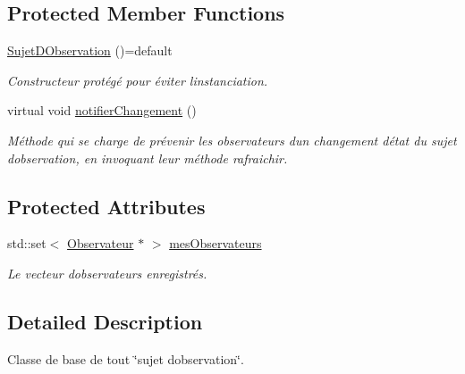 \subsection*{Protected Member Functions}
\begin{DoxyCompactItemize}
\item 
\hypertarget{class_sujet_d_observation_a148acc7f82782cd27456f89252ca0c23}{}\hyperlink{class_sujet_d_observation_a148acc7f82782cd27456f89252ca0c23}{Sujet\+D\+Observation} ()=default\label{class_sujet_d_observation_a148acc7f82782cd27456f89252ca0c23}

\begin{DoxyCompactList}\small\item\em Constructeur protégé pour éviter l\textquotesingle{}instanciation. \end{DoxyCompactList}\item 
virtual void \hyperlink{class_sujet_d_observation_ab4a833d911377a2dd3c83ce8ce3ac540}{notifier\+Changement} ()
\begin{DoxyCompactList}\small\item\em Méthode qui se charge de prévenir les observateurs d\textquotesingle{}un changement d\textquotesingle{}état du sujet d\textquotesingle{}observation, en invoquant leur méthode rafraichir. \end{DoxyCompactList}\end{DoxyCompactItemize}
\subsection*{Protected Attributes}
\begin{DoxyCompactItemize}
\item 
\hypertarget{class_sujet_d_observation_aa4dce06573ce3c9a7d896010706ab781}{}std\+::set$<$ \hyperlink{class_observateur}{Observateur} $\ast$ $>$ \hyperlink{class_sujet_d_observation_aa4dce06573ce3c9a7d896010706ab781}{mes\+Observateurs}\label{class_sujet_d_observation_aa4dce06573ce3c9a7d896010706ab781}

\begin{DoxyCompactList}\small\item\em Le vecteur d\textquotesingle{}observateurs enregistrés. \end{DoxyCompactList}\end{DoxyCompactItemize}


\subsection{Detailed Description}
Classe de base de tout \char`\"{}sujet d\textquotesingle{}observation\char`\"{}. 

